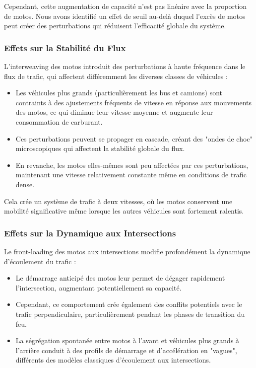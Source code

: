 Cependant, cette augmentation de capacité n'est pas linéaire avec la proportion de motos. Nous avons identifié un effet de seuil au-delà duquel l'excès de motos peut créer des perturbations qui réduisent l'efficacité globale du système.

\subsubsection{Effets sur la Stabilité du Flux}
\label{subsubsec:effets_stabilite}

L'interweaving des motos introduit des perturbations à haute fréquence dans le flux de trafic, qui affectent différemment les diverses classes de véhicules :

\begin{itemize}
\item Les véhicules plus grands (particulièrement les bus et camions) sont contraints à des ajustements fréquents de vitesse en réponse aux mouvements des motos, ce qui diminue leur vitesse moyenne et augmente leur consommation de carburant.

\item Ces perturbations peuvent se propager en cascade, créant des "ondes de choc" microscopiques qui affectent la stabilité globale du flux.

\item En revanche, les motos elles-mêmes sont peu affectées par ces perturbations, maintenant une vitesse relativement constante même en conditions de trafic dense.
\end{itemize}

Cela crée un système de trafic à deux vitesses, où les motos conservent une mobilité significative même lorsque les autres véhicules sont fortement ralentis.

\subsubsection{Effets sur la Dynamique aux Intersections}
\label{subsubsec:effets_intersections}

Le front-loading des motos aux intersections modifie profondément la dynamique d'écoulement du trafic :

\begin{itemize}
\item Le démarrage anticipé des motos leur permet de dégager rapidement l'intersection, augmentant potentiellement sa capacité.

\item Cependant, ce comportement crée également des conflits potentiels avec le trafic perpendiculaire, particulièrement pendant les phases de transition du feu.

\item La ségrégation spontanée entre motos à l'avant et véhicules plus grands à l'arrière conduit à des profils de démarrage et d'accélération en "vagues", différents des modèles classiques d'écoulement aux intersections.
\end{itemize}

